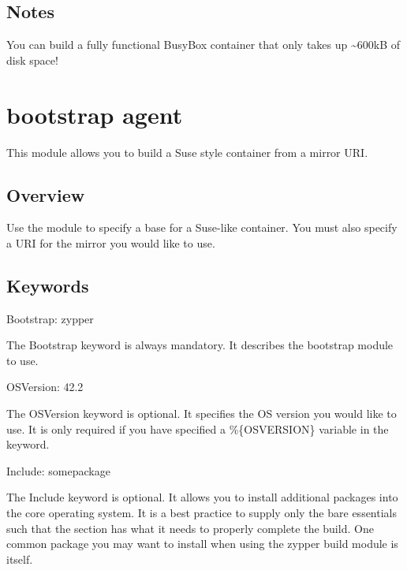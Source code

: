 \documentclass[letterpaper,10pt,english]{sphinxmanual}
\begin{document}
\subsection{Notes}
\label{\detokenize{appendix:id20}}
You can build a fully functional BusyBox container that only takes up \textasciitilde{}600kB of
disk space!


\section{ bootstrap agent}
\label{\detokenize{appendix:zypper-bootstrap-agent}}\label{\detokenize{appendix:build-zypper}}\label{\detokenize{appendix:sec-build-zypper}}
This module allows you to build a Suse style container from a mirror URI.


\subsection{Overview}
\label{\detokenize{appendix:id21}}
Use the  module to specify a base for a Suse-like container. You must
also specify a URI for the mirror you would like to use.


\subsection{Keywords}
\label{\detokenize{appendix:id22}}
%
\begin{sphinxVerbatim}[commandchars=\\\{\}]
Bootstrap: zypper
\end{sphinxVerbatim}

The Bootstrap keyword is always mandatory. It describes the bootstrap module to
use.

%
\begin{sphinxVerbatim}[commandchars=\\\{\}]
OSVersion: 42.2
\end{sphinxVerbatim}

The OSVersion keyword is optional. It specifies the OS version you would like to
use. It is only required if you have specified a \%\{OSVERSION\} variable in the
 keyword.

%
\begin{sphinxVerbatim}[commandchars=\\\{\}]
Include: somepackage
\end{sphinxVerbatim}

The Include keyword is optional. It allows you to install additional packages
into the core operating system. It is a best practice to supply only the bare
essentials such that the  section has what it needs to properly
complete the build. One common package you may want to install when using the
zypper build module is  itself.



\renewcommand{\indexname}{Index}
\printindex
\end{document}
